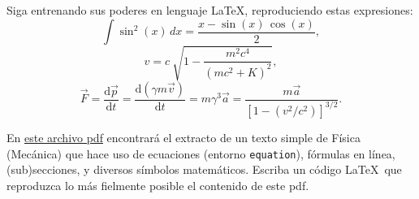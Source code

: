 \documentclass[11pt]{exam}
\begin{document}
\begin{questions}
\item Siga entrenando sus poderes en lenguaje \LaTeX, reproduciendo estas expresiones:
\begin{equation}
\int \sin^2(x)\,dx=\frac{x-\sin (x)\,\cos (x)}{2}  ,
\end{equation}
\begin{equation}
v = c \ \sqrt{1- \frac{{m^2 c^4}}{{(mc^2+K)^2}}},
\end{equation}
\begin{equation}
\vec{F} = \frac{\text{d}\vec{p}}{\text{d}t} = \frac{\text{d}(\gamma m \vec{v})}{\text{d}t} = m \gamma^3 \vec{a} = \frac{m \vec{a}}{[1-(v^2/c^2)]^{3/2}}.
\end{equation}


\item En \href{https://github.com/gfrubi/CC/blob/master/guias/05/ejemplo-g5.pdf}{este archivo pdf} encontrará el extracto de un texto simple de Física (Mecánica) que hace uso de ecuaciones (entorno \texttt{equation}), fórmulas en línea, (sub)secciones, y diversos símbolos matemáticos. Escriba un código \LaTeX\ que reproduzca lo más fielmente posible el contenido de este pdf.
\end{questions}
\end{document}
